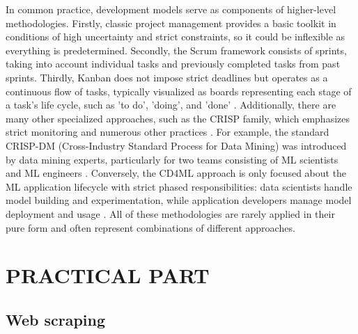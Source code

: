 In common practice, development models serve as components of higher-level methodologies. Firstly, classic project management provides a basic toolkit in conditions of high uncertainty and strict constraints, so it could be inflexible as everything is predetermined. Secondly, the Scrum framework consists of sprints, taking into account individual tasks and previously completed tasks from past sprints. Thirdly, Kanban does not impose strict deadlines but operates as a continuous flow of tasks, typically visualized as boards representing each stage of a task's life cycle, such as 'to do', 'doing', and 'done' \cite{kim_g_2016}. Additionally, there are many other specialized approaches, such as the CRISP family, which emphasizes strict monitoring and numerous other practices \cite{shankar_s_2024, martinez_i_2021}. For example, the standard CRISP-DM (Cross-Industry Standard Process for Data Mining) was introduced by data mining experts, particularly for two teams consisting of ML scientists and ML engineers \cite{testi_m_2022}. Conversely, the CD4ML approach is only focused about the ML application lifecycle with strict phased responsibilities: data scientists handle model building and experimentation, while application developers manage model deployment and usage \cite{makinen_s_2021}. All of these methodologies are rarely applied in their pure form and often represent combinations of different approaches.





\chapter[Practical part]{PRACTICAL PART}


\section[Web scraping]{Web scraping}
